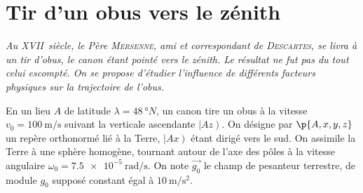 \documentclass[a4paper,french,bookmarks]{article}
\begin{document}
    \renewcommand{\thesection}{\Roman{section}} 
    \renewcommand{\thesubsection}{\thesection.\Alph{subsection}}
    \renewcommand{\labelenumi}{\thesection.\arabic{enumi}.}
    \renewcommand*{\labelenumii}{\thesection.\arabic{enumi}.\arabic{enumii}.}
    \renewcommand*{\labelenumiii}{\alph{enumiii}.}
    
    
    \section{Tir d'un obus vers le zénith}
    
    \emph{Au \textsc{XVII}\ieme~siècle, le Père \textsc{Mersenne}, ami et
    correspondant de \textsc{Descartes}, se livra à un tir d'obus, le canon
    étant pointé vers le zénith. Le résultat ne fut pas du tout celui escompté.
    On se propose d'étudier l'influence de différents facteurs physiques sur
    la trajectoire de l'obus.}\medskip
        
    En un lieu $A$ de latitude $\lambda = \qty{48}{\degree N}$, un canon
    tire un obus à la vitesse $v_0 = \qty{100}{\metre\per\second}$ suivant la
    verticale ascendante $\left\vert A z\right)$. On désigne par $\p{A, x, y,
    z}$ un repère orthonormé lié à la Terre, $\left\vert A x \right)$ étant
    dirigé vers le sud. On assimile la Terre à une sphère homogène, tournant
    autour de l'axe des pôles à la vitesse angulaire $\omega_0 =
    \qty{7.5e-5}{\radian\per\second}$. On note $\vec{g_0}$ le champ de
    pesanteur terrestre, de module $g_0$ supposé constant égal à
    $\qty{10}{\metre\per\second\squared}$.
\end{document}
